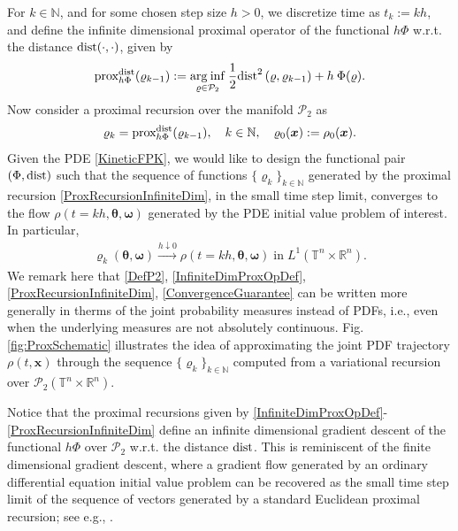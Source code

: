 \documentclass[10pt,twocolumn]{IEEEtran}
\begin{document}
For $k\in\mathbb{N}$, and for some chosen step size $h>0$, we discretize time as $t_{k} := kh$, and define the infinite dimensional proximal operator of the functional $h\Phi$ w.r.t. the distance ${\rm{dist}}(\cdot,\cdot)$, given by
\begin{eqnarray}
{\text{prox}}^{{\rm{dist}}}_{h\Phi}(\varrho_{k-1}) := \underset{\varrho\in\mathcal{P}_{2}} {{\rm{arg\:inf}}}\: \frac{1}{2} {\rm{dist}}^{2}\left(\varrho,\varrho_{k-1}\right) + h\: \Phi(\varrho).
\label{InfiniteDimProxOpDef}
\end{eqnarray}
Now consider a proximal recursion over the manifold $\mathcal{P}_{2}$ as
\begin{eqnarray}
\varrho_{k} = {\text{prox}}^{{\rm{dist}}}_{h\Phi}(\varrho_{k-1}), \quad k\in\mathbb{N}, \quad \varrho_{0}(\bm{x}) := \rho_{0}(\bm{x}).
\label{ProxRecursionInfiniteDim}	
\end{eqnarray}
Given the PDE \eqref{KineticFPK}, we would like to design the functional pair $\left(\Phi,{\rm{dist}}\right)$ such that the sequence of functions $\{\varrho_{k}\}_{k\in\mathbb{N}}$ generated by the proximal recursion \eqref{ProxRecursionInfiniteDim}, in the small time step limit, converges to the flow $\rho(t=kh,\bm{\theta},\bm{\omega})$ generated by the PDE initial value problem of interest. In particular,
\begin{align}
\varrho_{k}(\bm{\theta},\bm{\omega}) \xrightarrow{h\downarrow 0} \rho(t=kh,\bm{\theta},\bm{\omega}) \;\text{in}\;L^{1}\left(\mathbb{T}^{n} \times \mathbb{R}^{n}\right).
\label{ConvergenceGuarantee}	
\end{align}
We remark here that \eqref{DefP2}, \eqref{InfiniteDimProxOpDef}, \eqref{ProxRecursionInfiniteDim}, \eqref{ConvergenceGuarantee} can be written more generally in therms of the joint probability measures instead of PDFs, i.e., even when the underlying measures are not absolutely continuous. Fig. \ref{fig:ProxSchematic} illustrates the idea of approximating the joint PDF trajectory $\rho(t,\bm{x})$ through the sequence $\{\varrho_{k}\}_{k\in\mathbb{N}}$ computed from a variational recursion over $\mathcal{P}_{2}\left(\mathbb{T}^{n}\times\mathbb{R}^{n}\right)$.

Notice that the proximal recursions given by \eqref{InfiniteDimProxOpDef}-\eqref{ProxRecursionInfiniteDim} define an infinite dimensional gradient descent of the functional $h\Phi$ over $\mathcal{P}_{2}$ w.r.t. the distance ${\rm{dist}}$. This is reminiscent of the finite dimensional gradient descent, where a gradient flow generated by an ordinary differential equation initial value problem can be recovered as the small time step limit of the sequence of vectors generated by a standard Euclidean proximal recursion; see e.g., \cite[Sec. I]{caluya2019TAC}.
\end{document}
